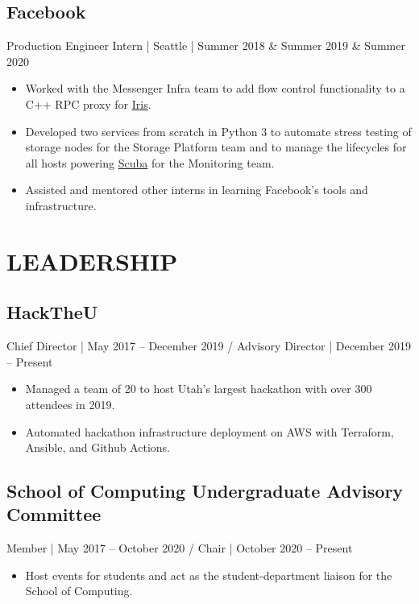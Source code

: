 \documentclass[10pt, letterpaper]{resume}
\begin{document}
\subsection{Facebook}
Production Engineer Intern | Seattle | Summer 2018 \& Summer 2019 \& Summer 2020
\begin{itemize}
    \item Worked with the Messenger Infra team to add flow control functionality to a C++ RPC proxy for \href{https://engineering.fb.com/production-engineering/building-mobile-first-infrastructure-for-messenger/}{Iris}.
 \item Developed two services from scratch in Python 3 to automate stress testing of storage nodes for the Storage Platform team and to manage the lifecycles for all hosts powering \href{https://research.fb.com/wp-content/uploads/2016/11/scuba-diving-into-data-at-facebook.pdf}{Scuba} for the Monitoring team.
 \item Assisted and mentored other interns in learning Facebook's tools and infrastructure.
\end{itemize}

\section{LEADERSHIP}
\subsection{HackTheU}
Chief Director | May 2017 -- December 2019 / Advisory Director | December 2019 -- Present

\begin{itemize}
  \item Managed a team of 20 to host Utah's largest hackathon with over 300 attendees in 2019.
  \item Automated hackathon infrastructure deployment on AWS with Terraform, Ansible, and Github Actions.
\end{itemize}

\subsection{School of Computing Undergraduate Advisory Committee}
Member | May 2017 -- October 2020 / Chair | October 2020 -- Present
\begin{itemize}
  \item Host events for students and act as the student-department liaison for the School of Computing.
\end{itemize}
\end{document}
